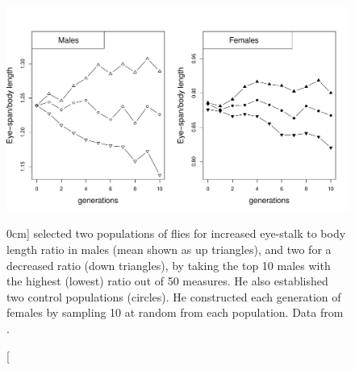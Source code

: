 \begin{figure}
\begin{center}
\includegraphics[width= \textwidth]{Journal_figs/Quant_gen/stalk_eyed_flies/stalk_eyed_flies_response.pdf}
\end{center}
\caption[][0cm]{ \citeauthor{wilkinson:93} selected two populations of flies for
 increased eye-stalk to body length ratio in males (mean shown as
 up triangles), and two for a
 decreased ratio (down triangles), by taking the top 10 males with the highest (lowest)
 ratio out of 50 measures. He also established two control populations
 (circles). He constructed each generation of females by sampling 10
 at random from each population.  Data from \citet{wilkinson:93}.  } \label{fig:Stalk_eyed_response}   %
\end{figure}

